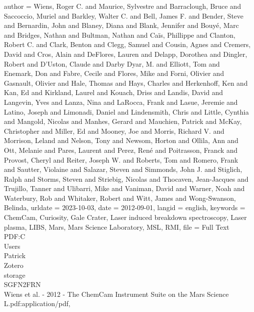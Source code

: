 {	author = {Wiens, Roger C. and Maurice, Sylvestre and Barraclough, Bruce and Saccoccio, Muriel and Barkley, Walter C. and Bell, James F. and Bender, Steve and Bernardin, John and Blaney, Diana and Blank, Jennifer and Bouyé, Marc and Bridges, Nathan and Bultman, Nathan and Caïs, Phillippe and Clanton, Robert C. and Clark, Benton and Clegg, Samuel and Cousin, Agnes and Cremers, David and Cros, Alain and {DeFlores}, Lauren and Delapp, Dorothea and Dingler, Robert and D’Uston, Claude and Darby Dyar, M. and Elliott, Tom and Enemark, Don and Fabre, Cecile and Flores, Mike and Forni, Olivier and Gasnault, Olivier and Hale, Thomas and Hays, Charles and Herkenhoff, Ken and Kan, Ed and Kirkland, Laurel and Kouach, Driss and Landis, David and Langevin, Yves and Lanza, Nina and {LaRocca}, Frank and Lasue, Jeremie and Latino, Joseph and Limonadi, Daniel and Lindensmith, Chris and Little, Cynthia and Mangold, Nicolas and Manhes, Gerard and Mauchien, Patrick and {McKay}, Christopher and Miller, Ed and Mooney, Joe and Morris, Richard V. and Morrison, Leland and Nelson, Tony and Newsom, Horton and Ollila, Ann and Ott, Melanie and Pares, Laurent and Perez, René and Poitrasson, Franck and Provost, Cheryl and Reiter, Joseph W. and Roberts, Tom and Romero, Frank and Sautter, Violaine and Salazar, Steven and Simmonds, John J. and Stiglich, Ralph and Storms, Steven and Striebig, Nicolas and Thocaven, Jean-Jacques and Trujillo, Tanner and Ulibarri, Mike and Vaniman, David and Warner, Noah and Waterbury, Rob and Whitaker, Robert and Witt, James and Wong-Swanson, Belinda},
	urldate = {2023-10-03},
	date = {2012-09-01},
	langid = {english},
	keywords = {{ChemCam}, Curiosity, Gale Crater, Laser induced breakdown spectroscopy, Laser plasma, {LIBS}, Mars, Mars Science Laboratory, {MSL}, {RMI}},
	file = {Full Text PDF:C\:\\Users\\Patrick\\Zotero\\storage\\SGFN2FRN\\Wiens et al. - 2012 - The ChemCam Instrument Suite on the Mars Science L.pdf:application/pdf},
}

